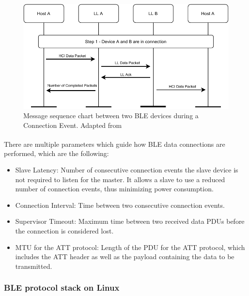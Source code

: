 \begin{figure}[H]
    \centering
    \includegraphics[width=\linewidth]{images/ble-sending-data.pdf}
    \caption[Message sequence chart between two \acs{BLE} devices during a Connection Event.]{Message sequence chart between two \acs{BLE} devices during a Connection Event. Adapted from \cite{Specification1999}}
    \label{fig:ble-message-sequence-chart}
\end{figure}

\paragraph{} There are multiple parameters which guide how \acs{BLE} data connections are performed, which are the following: 
\begin{itemize}
    \item Slave Latency: Number of consecutive connection events the slave device is not required to listen for the master. It allows a slave to use a reduced number of connection events, thus minimizing power consumption.
    \item Connection Interval: Time between two consecutive connection events.
    \item Supervisor Timeout: Maximum time between two received data \acs{PDU}s before the connection is considered lost.
    \item \acf{MTU} for the \acs{ATT} protocol: Length of the \acs{PDU} for the \acs{ATT} protocol, which includes the \acs{ATT} header as well as the payload containing the data to be transmitted.
\end{itemize}

\subsubsection{\acs{BLE} protocol stack on Linux} 

